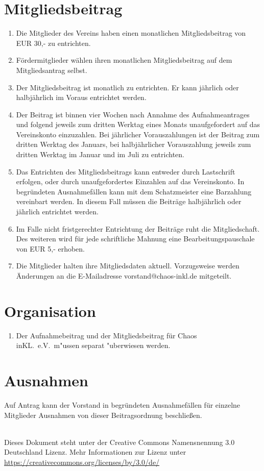 \documentclass[a4paper, 12pt]{scrartcl}
\begin{document}
\section{Mitgliedsbeitrag}
\begin{enumerate}
	\item Die Mitglieder des Vereins haben einen monatlichen Mitgliedsbeitrag von EUR 30,- zu entrichten.
	\item Fördermitglieder wählen ihren monatlichen Mitgliedsbeitrag auf dem Mitgliedsantrag selbst.
	\item Der Mitgliedsbeitrag ist monatlich zu entrichten. Er kann jährlich oder halbjährlich im Voraus entrichtet werden.
	\item Der Beitrag ist binnen vier Wochen nach Annahme des Aufnahmeantrages und folgend jeweils zum dritten Werktag eines Monats unaufgefordert auf das Vereinskonto einzuzahlen. Bei jährlicher Vorauszahlungen ist der Beitrag zum dritten Werktag des Januars, bei halbjährlicher Vorauszahlung jeweils zum dritten Werktag im Januar und im Juli zu entrichten.
	\item Das Entrichten des Mitgliedsbeitrags kann entweder durch Lastschrift erfolgen, oder durch unaufgefordertes Einzahlen auf das Vereinskonto. In begründeten Ausnahmefällen kann mit dem Schatzmeister eine Barzahlung vereinbart werden. In diesem Fall müssen die Beiträge halbjährlich oder jährlich entrichtet werden.
	\item Im Falle nicht fristgerechter Entrichtung der Beiträge ruht die Mitgliedschaft. Des weiteren wird für jede schriftliche Mahnung eine Bearbeitungspauschale von EUR 5,- erhoben.
	\item Die Mitglieder halten ihre Mitgliedsdaten aktuell. Vorzugsweise
    werden Änderungen an die E-Mailadresse
    vorstand@chaos-inkl.de mitgeteilt. 
\end{enumerate}

\section{Organisation}
\begin{enumerate}
	\item Der Aufnahmebeitrag und der Mitgliedsbeitrag für Chaos inKL.\ e.V.\ m"ussen separat "uberwiesen werden.
\end{enumerate}

\section{Ausnahmen}
Auf Antrag kann der Vorstand in begründeten Ausnahmefällen für einzelne Mitglieder Ausnahmen von dieser Beitragsordnung beschließen.

\vfill

\begin{flushright}
	\ccby \\
	{\small
		Dieses Dokument steht unter der Creative Commons Namensnennung 3.0 Deutschland Lizenz. Mehr Informationen zur Lizenz unter \url{https://creativecommons.org/licenses/by/3.0/de/}
	}
\end{flushright}
\end{document}
